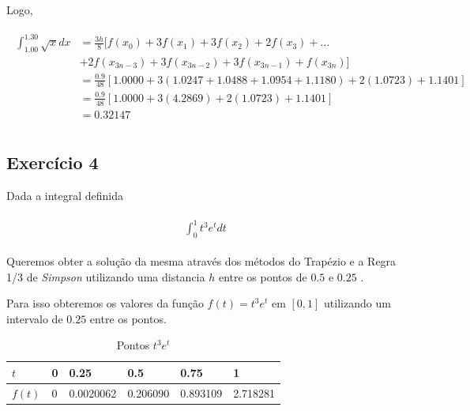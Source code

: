 \documentclass[paper=a4, fontsize=12pt]{scrartcl}
\numberwithin{equation}{section} %
\numberwithin{figure}{section} %
\numberwithin{table}{section} %
\newcommand{\euler}{e}
\begin{document}
		Logo,

		\begin{align*}
			\begin{split}
				\int_{1.00}^{1.30} \sqrt{x} dx
				&= \frac{3h}{8}[ f(x_0) + 3f(x_1) + 3f(x_2) + 2f(x_3) + \ldots \\
				&+ 2f(x_{3n-3}) + 3f(x_{3n-2}) + 3f(x_{3n-1}) + f(x_{3n})] \\
				&= \frac{0.9}{48}\left[ 1.0000 + 3(1.0247 + 1.0488 + 1.0954 + 1.1180) + 2(1.0723) + 1.1401 \right] \\
				&= \frac{0.9}{48}\left[ 1.0000 + 3(4.2869) + 2(1.0723) + 1.1401 \right]\\
				&= 0.32147 \\
			\end{split}
		\end{align*}

		\subsection{Exercício 4}

		Dada a integral definida

		\begin{align*}
			\begin{split}
			\int_{0}^{1} t^{3}\euler^{t} dt
			\end{split}
		\end{align*}

		Queremos obter a solução da mesma através dos métodos do Trapézio e a Regra 1/3 de \textit{Simpson} utilizando uma distancia $h$ entre os pontos de $ 0.5 $ e $ 0.25 $ .

		Para isso obteremos os valores da função $f(t) = t^{3}\euler^{t}$ em $[0, 1]$ utilizando um intervalo de $0.25$ entre os pontos.

 		\begin{table}[H]
 			\def\arraystretch{1.5}
 			\begin{center}
 				\caption{Pontos $t^{3}\euler^{t}$}
 				\label{points_ex04}
 				\begin{tabularx}
 					{\textwidth}{|X|p{2cm}|p{2cm}|p{2cm}|p{2cm}|p{2cm}|}
 					\hline
 					{$t$} & 0 & 0.25 & 0.5 & 0.75 & 1 \\
 					\hline
 					{$f{(t)}$} & 0 & 0.0020062 & 0.206090 & 0.893109 & 2.718281 \\
 					\hline
 				\end{tabularx}
 			\end{center}
 		\end{table}
\end{document}
